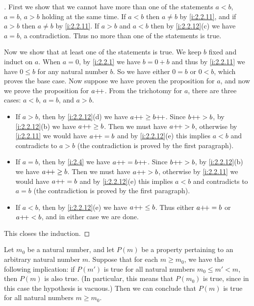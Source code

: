 \begin{proof}[]
  First we show that we cannot have more than one of the statements \(a < b\), \(a = b\), \(a > b\) holding at the same time.
  If \(a < b\) then \(a \neq b\) by \cref{i:2.2.11}, and if \(a > b\) then \(a \neq b\) by \cref{i:2.2.11}.
  If \(a > b\) and \(a < b\) then by \cref{i:2.2.12}(c) we have \(a = b\), a contradiction.
  Thus no more than one of the statements is true.

  Now we show that at least one of the statements is true.
  We keep \(b\) fixed and induct on \(a\).
  When \(a = 0\), by \cref{i:2.2.1} we have \(b = 0 + b\) and thus by \cref{i:2.2.11} we have \(0 \leq b\) for any natural number \(b\).
  So we have either \(0 = b\) or \(0 < b\), which proves the base case.
  Now suppose we have proven the proposition for \(a\), and now we prove the proposition for \(a{+}\!{+}\).
  From the trichotomy for \(a\), there are three cases: \(a < b\), \(a = b\), and \(a > b\).
  \begin{itemize}
    \item If \(a > b\), then by \cref{i:2.2.12}(d) we have \(a{+}\!{+} \geq b{+}\!{+}\).
          Since \(b{+}\!{+} > b\), by \cref{i:2.2.12}(b) we have \(a{+}\!{+} \geq b\).
          Then we must have \(a{+}\!{+} > b\), otherwise by \cref{i:2.2.11} we would have \(a{+}\!{+} = b\) and by \cref{i:2.2.12}(e) this implies \(a < b\) and contradicts to \(a > b\)
          (the contradiction is proved by the first paragraph).
    \item If \(a = b\), then by \cref{i:2.4} we have \(a{+}\!{+} = b{+}\!{+}\).
          Since \(b{+}\!{+} > b\), by \cref{i:2.2.12}(b) we have \(a{+}\!{+} \geq b\).
          Then we must have \(a{+}\!{+} > b\), otherwise by \cref{i:2.2.11} we would have \(a{+}\!{+} = b\) and by \cref{i:2.2.12}(e) this implies \(a < b\) and contradicts to \(a = b\)
          (the contradiction is proved by the first paragraph).
    \item If \(a < b\), then by \cref{i:2.2.12}(e) we have \(a{+}\!{+} \leq b\).
          Thus either \(a{+}\!{+} = b\) or \(a{+}\!{+} < b\), and in either case we are done.
  \end{itemize}
  This closes the induction.
\end{proof}

\begin{prop}\label{i:2.2.14}
  Let \(m_0\) be a natural number, and let \(P(m)\) be a property pertaining to an arbitrary natural number \(m\).
  Suppose that for each \(m \geq m_0\), we have the following implication: if \(P(m')\) is true for all natural numbers \(m_0 \leq m' < m\), then \(P(m)\) is also true.
  (In particular, this means that \(P(m_0)\) is true, since in this case the hypothesis is vacuous.)
  Then we can conclude that \(P(m)\) is true for all natural numbers \(m \geq m_0\).
\end{prop}

